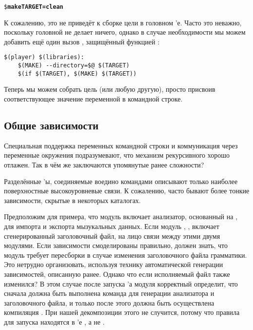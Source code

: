 {\footnotesize
\begin{alltt}
\$ \textbf{make TARGET=clean}
\end{alltt}
}

К сожалению, это не приведёт к сборке цели  в
головном \Makefile{}'е. Часто это неважно, поскольку головной
\Makefile{} не делает ничего, однако в случае необходимости мы можем
добавить ещё один вызов \GNUmake{}, защищённый функцией :

{\footnotesize
\begin{verbatim}
$(player) $(libraries):
    $(MAKE) --directory=$@ $(TARGET)
    $(if $(TARGET), $(MAKE) $(TARGET))
\end{verbatim}
}

Теперь мы можем собрать цель  (или любую другую), просто
присвоив соответствующее значение переменной  в
командной строке.

\subsection{Общие зависимости}

Специальная поддержка \GNUmake{} переменных командной строки и
коммуникация через переменные окружения подразумевают, что механизм
рекурсивного \GNUmake{} хорошо отлажен. Так в чём же заключаются
упомянутые ранее сложности?

Разделённые \Makefile{}'ы, соединяемые воедино командами
 описывают только наиболее поверхностные
высокоуровневые связи. К сожалению, часто бывают более тонкие
зависимости, скрытые в некоторых каталогах.

Предположим для примера, что модуль  включает анализатор,
основанный на , для импорта и экспорта мызукальных
данных. Если модуль , , включает
сгенерированный  заголовочный файл, на лицо связи между
этими двумя модулями. Если зависимости смоделированы правильно,
\GNUmake{} должен знать, что модуль  требует пересборки в
случае изменения заголовочного файла грамматики. Это нетрудно
организовать, используя технику автоматической генерации зависимостей,
описанную ранее. Однако что если исполняемый файл  также
изменился? В этом случае после запуска \Makefile{}'а модуля
 корректный \Makefile{} определит, что сначала должна
быть выполнена команда  для генерации анализатора и
заголовочного файла, и только после этого должна быть осуществлена
компиляция . При нашей декомпозиции этого не случится,
потому что правила для запуска  находятся в
\Makefile{}'е , а не .

